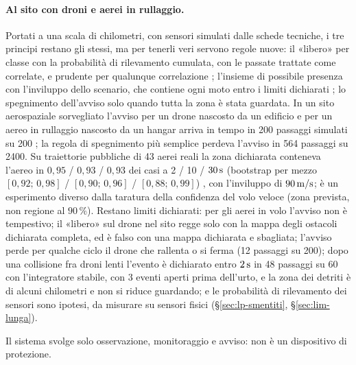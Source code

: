 \paragraph{Al sito con droni e aerei in rullaggio.} Portati a una scala di chilometri, con sensori simulati dalle schede tecniche, i tre principi restano gli stessi, ma per tenerli veri servono regole nuove: il «libero» per classe con la probabilità di rilevamento cumulata, con le passate trattate come correlate, e prudente per qualunque correlazione ; l'insieme di possibile presenza con l'inviluppo dello scenario, che contiene ogni moto entro i limiti dichiarati ; lo spegnimento dell'avviso solo quando tutta la zona è stata guardata. In un sito aerospaziale sorvegliato l'avviso per un drone nascosto da un edificio e per un aereo in rullaggio nascosto da un hangar arriva in tempo in 200 passaggi simulati su 200 ; la regola di spegnimento più semplice perdeva l'avviso in 564 passaggi su 2400. Su traiettorie pubbliche di 43 aerei reali la zona dichiarata conteneva l'aereo in $0{,}95$ / $0{,}93$ / $0{,}93$ dei casi a 2 / 10 / $30\,\mathrm{s}$ (bootstrap per mezzo $[0{,}92;\,0{,}98]$ / $[0{,}90;\,0{,}96]$ / $[0{,}88;\,0{,}99]$) , con l'inviluppo di $90\,\mathrm{m/s}$; è un esperimento diverso dalla taratura della confidenza del volo veloce (zona prevista, non regione al $90\,\%$).
Restano limiti dichiarati: per gli aerei in volo l'avviso non è tempestivo; il «libero» sul drone nel sito regge solo con la mappa degli ostacoli dichiarata completa, ed è falso con una mappa dichiarata e sbagliata; l'avviso perde per qualche ciclo il drone che rallenta o si ferma (12 passaggi su 200); dopo una collisione fra droni lenti l'evento è dichiarato entro $2\,\mathrm{s}$ in 48 passaggi su 60 con l'integratore stabile, con 3 eventi aperti prima dell'urto, e la zona dei detriti è di alcuni chilometri e non si riduce guardando; e le probabilità di rilevamento dei sensori sono ipotesi, da misurare su sensori fisici (\S\ref{sec:lp-smentiti}, \S\ref{sec:lim-lunga}).

Il sistema svolge solo osservazione, monitoraggio e avviso: non è un dispositivo di protezione.
